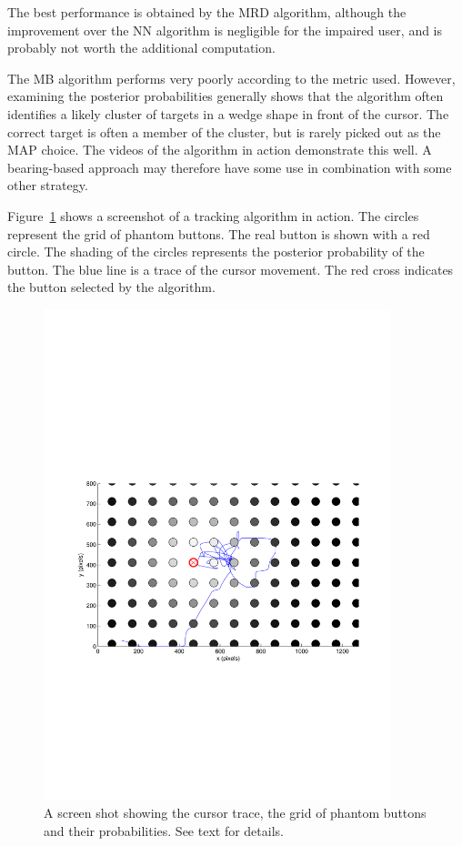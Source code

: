 The best performance is obtained by the MRD algorithm, although the improvement over the NN algorithm is negligible for the impaired user, and is probably not worth the additional computation.

The MB algorithm performs very poorly according to the metric used. However, examining the posterior probabilities generally shows that the algorithm often identifies a likely cluster of targets in a wedge shape in front of the cursor. The correct target is often a member of the cluster, but is rarely picked out as the MAP choice. The videos of the algorithm in action demonstrate this well. A bearing-based approach may therefore have some use in combination with some other strategy.

Figure~\ref{fig:CursorTracking} shows a screenshot of a tracking algorithm in action. The circles represent the grid of phantom buttons. The real button is shown with a red circle. The shading of the circles represents the posterior probability of the button. The blue line is a trace of the cursor movement. The red cross indicates the button selected by the algorithm.

\begin{figure}[hbt]
\centering \includegraphics[width=0.9\textwidth]{MovieScreenshot.pdf}
\caption{A screen shot showing the cursor trace, the grid of phantom buttons and their probabilities. See text for details.}
\label{fig:CursorTracking}
\end{figure}